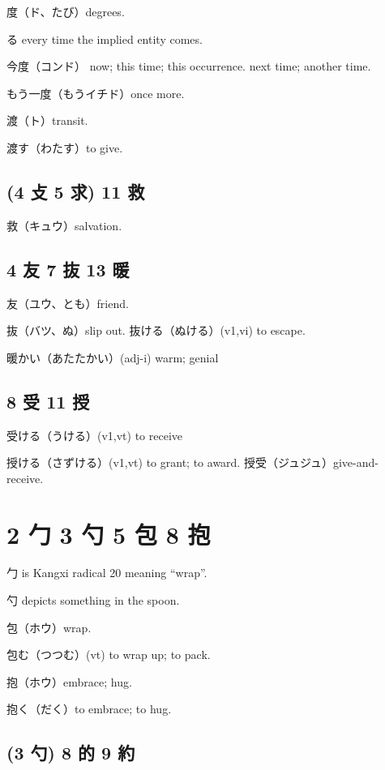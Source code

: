 度（ド、たび）degrees.

る
every time the implied entity comes.

今度（コンド）
now; this time; this occurrence.
next time; another time.

もう一度（もうイチド）once more.

渡（ト）transit.

渡す（わたす）to give.

\subsection{(4 攴 5 求) 11 救}

救（キュウ）salvation.

\subsection{4 友 7 抜 13 暖}

友（ユウ、とも）friend.

抜（バツ、ぬ）slip out.
抜ける（ぬける）(v1,vi) to escape.

暖かい（あたたかい）(adj-i) warm; genial

\subsection{8 受 11 授}

受ける（うける）(v1,vt) to receive

授ける（さずける）(v1,vt) to grant; to award.
授受（ジュジュ）give-and-receive.

\section{2 勹 3 勺 5 包 8 抱}

勹 is Kangxi radical 20 meaning ``wrap''.

勺 depicts something in the spoon.

包（ホウ）wrap.

包む（つつむ）(vt) to wrap up; to pack.

抱（ホウ）embrace; hug.

抱く（だく）to embrace; to hug.

\subsection{(3 勺) 8 的 9 約}

